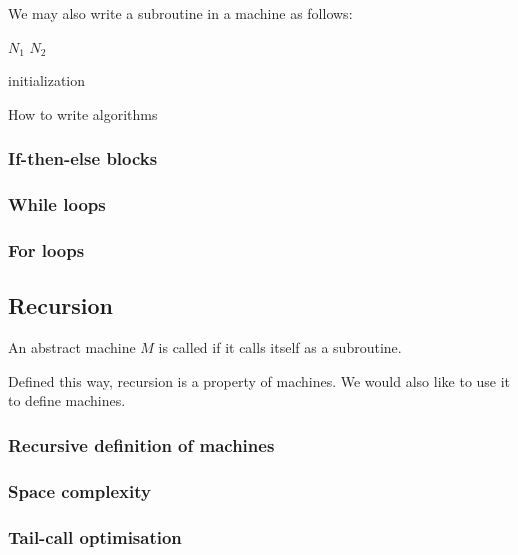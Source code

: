 We may also write a subroutine in a machine as follows:

\begin{centeredAlgorithm}
$N_1$\;
$N_2$ \; 
\end{centeredAlgorithm}

\begin{algorithm}[H]
{}
initialization\;
\caption{How to write algorithms}
\end{algorithm}

\subsubsection{If-then-else blocks}
\subsubsection{While loops}
\subsubsection{For loops}

\subsection{Recursion}
\begin{definition}
An abstract machine $M$ is called  if it calls itself as a subroutine.
\end{definition}

Defined this way, recursion is a property of machines. We would also like to use it to define machines.

\subsubsection{Recursive definition of machines}


\subsubsection{Space complexity}
\subsubsection{Tail-call optimisation}

